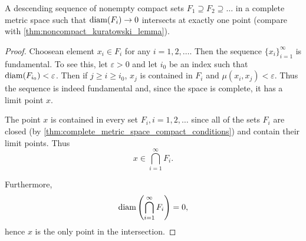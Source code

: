 \begin{theorem}[Cantor]\label{thm:cantor_nested_compacts}
  A descending sequence of nonempty compact sets \( F_1 \supseteq F_2 \supseteq \ldots \) in a complete metric space such that \( \operatorname{diam}(F_i) \to 0 \) intersects at exactly one point (compare with \cref{thm:noncompact_kuratowski_lemma}).
\end{theorem}
\begin{proof}
  Choose\AOC an element \( x_i \in F_i \) for any \( i = 1, 2, \ldots \). Then the sequence \( \{ x_i \}_{i=1}^\infty \) is fundamental. To see this, let \( \varepsilon > 0 \) and let \( i_0 \) be an index such that \( \operatorname{diam}(F_{i_0}) < \varepsilon \). Then if \( j \geq i \geq i_0 \), \( x_j \) is contained in \( F_i \) and \( \mu(x_i, x_j) < \varepsilon \). Thus the sequence is indeed fundamental and, since the space is complete, it has a limit point \( x \).

  The point \( x \) is contained in every set \( F_i, i = 1, 2, \ldots \) since all of the sets \( F_i \) are closed (by \cref{thm:complete_metric_space_compact_conditions}) and contain their limit points. Thus
  \begin{equation*}
    x \in \bigcap_{i=1}^\infty F_i.
  \end{equation*}

  Furthermore,
  \begin{equation*}
    \operatorname{diam}\left( \bigcap_{i=1}^\infty F_i \right) = 0,
  \end{equation*}
  hence \( x \) is the only point in the intersection.
\end{proof}

